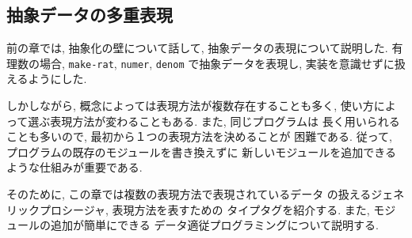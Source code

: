 \subsection{抽象データの多重表現}
%
前の章では, 抽象化の壁について話して,
抽象データの表現について説明した. 有理数の場合,
\lstinline{make-rat}, \lstinline{numer}, \lstinline{denom}
で抽象データを表現し, 実装を意識せずに扱えるようにした.

しかしながら, 概念によっては表現方法が複数存在することも多く,
使い方によって選ぶ表現方法が変わることもある. また, 同じプログラムは
長く用いられることも多いので, 最初から１つの表現方法を決めることが
困難である. 従って, プログラムの既存のモジュールを書き換えずに
新しいモジュールを追加できるような仕組みが重要である.

そのために, この章では複数の表現方法で表現されているデータ
の扱えるジェネリックプロシージャ, 表現方法を表すための
タイプタグを紹介する. また, モジュールの追加が簡単にできる
データ適従プログラミングについて説明する.
%

%

%

